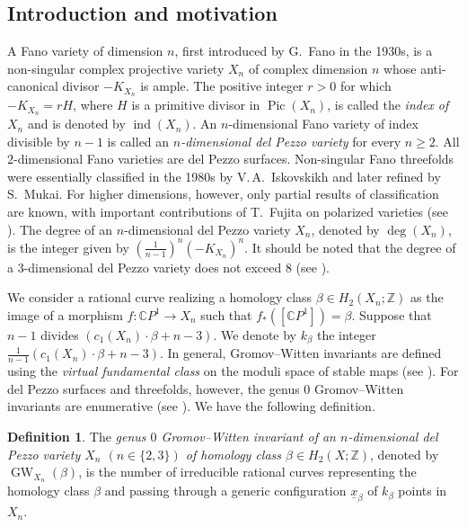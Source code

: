 \documentclass[11pt]{amsart}
\numberwithin{equation}{section}
\theoremstyle{definition}
\newtheorem{definition}{Definition}[section]
\theoremstyle{plain}
\theoremstyle{remark}
\newcommand{\Z}{\mathbb{Z}}
\DeclareMathOperator{\GW}{GW}
\DeclareMathOperator{\ind}{ind}
\DeclareMathOperator{\Pic}{Pic}
\begin{document}
\subsection{Introduction and motivation}
A Fano variety of dimension $n$, first introduced by G.~Fano in the 1930s, is a non-singular complex projective variety $X_n$ of complex dimension $n$ whose anti-canonical divisor $-K_{X_n}$ is ample. The positive integer $r>0$ for which $-K_{X_n}=rH$, where $H$ is a primitive divisor in $\Pic(X_n)$, is called the \textit{index of\, $X_n$} and is denoted by $\ind(X_n)$. An $n$-dimensional Fano variety of index divisible by $n-1$ is called an \textit{$n$-dimensional del Pezzo variety} for every $n\geq 2$. All $2$-dimensional Fano varieties are del Pezzo surfaces.  Non-singular Fano threefolds were essentially classified in the 1980s by V.\,A.~Iskovskikh and later refined by S.~Mukai. For higher dimensions, however, only partial results of classification are known, with important contributions of T.~Fujita on polarized varieties (see 
 \cite{iskovskikh2010algebraic}). The degree of an $n$-dimensional del Pezzo variety $X_n$, denoted by $\deg(X_n)$, is the integer given by $(\frac{1}{n-1})^n(-K_{X_n})^n$. It should be noted that the degree of a $3$-dimensional del Pezzo variety does not exceed $8$  (see \cite[Chapters~2 and~3]{iskovskikh2010algebraic}).
 

We consider a rational curve realizing a homology class $\beta\in H_2(X_n;\Z)$ as the image of a morphism $f\colon \mathbb{C}P^1\rightarrow X_n$ such that $f_*([\mathbb{C}P^1])=\beta$. Suppose that $n-1$ divides $\left(c_1(X_n)\cdot\beta+n-3\right)$. We denote by $k_\beta$ the integer $\frac{1}{n-1} \left(c_1(X_n)\cdot\beta+n-3\right)$. In general, Gromov--Witten invariants are defined using the \emph{virtual fundamental class} on the moduli space of stable maps (see \cite{KontsevichManin}). For del Pezzo surfaces and threefolds, however, the genus $0$ Gromov--Witten invariants are enumerative (see \cite{Vakil,Coskun,iskovskikh2010algebraic}). We have the following definition.

\begin{definition} \label{definitionGW}
The \emph{genus $0$ Gromov--Witten invariant of an  $n$-dimensional del Pezzo variety $X_n$ $(n\in \{2,3\})$ of homology class $\beta\in H_2(X;\Z)$},  denoted by $\GW_{X_n}(\beta)$, is the number of irreducible rational curves representing the homology class $\beta$ and passing through a generic configuration $\underline{x}_\beta$ of $k_\beta$ points in $X_n$.
\end{definition}
\end{document}
